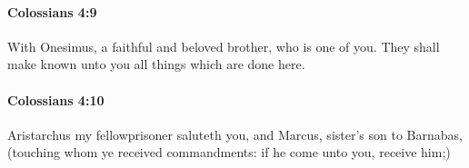 		\paragraph{Colossians 4:9} %
			\label{COLOSSIANS-4-9}

			With Onesimus, a faithful and beloved brother, who is one of you.  They shall make known unto you all things which are done here.

			\begin{framed}
			\scriptsize
				\begin{compactdesc}
					\item[SBLG] 
				\end{compactdesc}
			\end{framed}

		\paragraph{Colossians 4:10} %
			\label{COLOSSIANS-4-10}

			Aristarchus my fellowprisoner saluteth you, and Marcus, sister's son to Barnabas, (touching whom ye received commandments: if he come unto you, receive him;)

